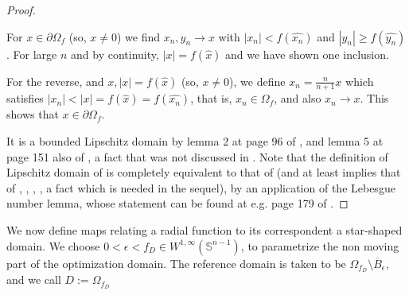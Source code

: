 \documentclass[english,a4paper,9pt,oneside]{scrbook}	%
\theoremstyle{break}
\newenvironment{mproof}[1][\proofname]{%
  \begin{proof}[#1]$ $\par\nobreak\ignorespaces
}{%
  \end{proof}
}
\renewcommand*{\proofname}{Proof}
\theoremstyle{remark}
\newcommand{\mS}{\mathbb{S}^{n-1}}
\newcommand{\xh}{\hat{x}}
\newcommand{\eps}{\epsilon}
\begin{document}
\begin{mproof}

For $x \in \partial \Omega_f$ (so, $x\neq 0$) we find $x_n, y_n \rightarrow x$ with $|x_n|<f(\widehat{x_n})$ and $|y_n|\geq f(\widehat{y_n})$. For large $n$ and by continuity, $|x| = f(\xh)$ and we have shown one inclusion.

For the reverse, and $x, |x|=f(\xh)$ (so, $x\neq 0$), we define $x_n = \frac{n}{n+1} x$ which satisfies $|x_n|<|x|=f(\xh)=f(\widehat{x_n})$, that is, $x_n \in \Omega_f$, and also $x_n\rightarrow x$. This shows that $x \in \partial \Omega_f$.

It is a bounded Lipschitz domain by lemma 2 at page 96 of \cite{burenkov}, and lemma 5 at page 151 also of \cite{burenkov}, a fact that was not discussed in \cite{deckelnick}. Note that the definition of Lipschitz domain of \cite{burenkov} is completely equivalent to that of \cite{bello} (and at least implies that of \cite{mclean}, \cite{grisvard}, \cite{leoni}, \cite{adams}, a fact which is needed in the sequel), by an application of the Lebesgue number lemma, whose statement can be found at e.g. page 179 of \cite{munkres}.
\end{mproof}

We now define maps relating a radial function to its correspondent a star-shaped domain. We choose $0<\eps <f_D \in W^{1,\infty}(\mS)$, to parametrize the non moving part of the optimization domain. The reference domain is taken to be $\Omega_{f_D}\setminus \overline{B}_\eps$, and we call $D:=\Omega_{f_D}$
\end{document}
